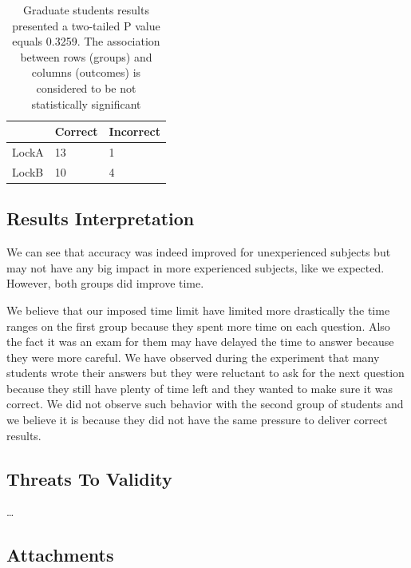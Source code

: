 \begin{table}
\begin{center}
\caption{Graduate students results presented a two-tailed P value equals 0.3259. The association between rows (groups) and columns (outcomes) is considered to be not statistically significant}
\begin{tabular}{|l|l|l|}
\hline
 & Correct & Incorrect\\
\hline
LockA & 13 & 1\\
LockB & 10 & 4\\
\hline
\end{tabular}
\end{center}
\end{table}

\subsection{Results Interpretation}

We can see that accuracy was indeed improved for unexperienced subjects but may not have any big impact in more experienced subjects, like we expected. However, both groups did improve time.

We believe that our imposed time limit have limited more drastically the time ranges on the first group because they spent more time on each question. Also the fact it was an exam for them may have delayed the time to answer because they were more careful. We have observed during the experiment that many students wrote their answers but they were reluctant to ask for the next question because they still have plenty of time left and they wanted to make sure it was correct. We did not observe such behavior with the second group of students and we believe it is because they did not have the same pressure to deliver correct results.

\subsection{Threats To Validity}

\dots

\subsection{Attachments}

